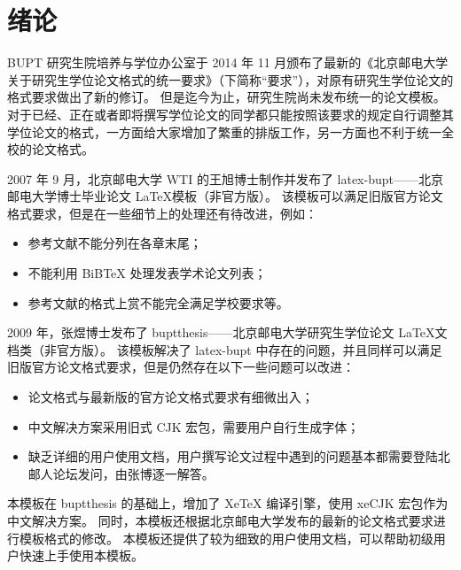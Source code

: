 
\chapter{绪论}

\gls{BUPT} 研究生院培养与学位办公室于 2014 年 11 月颁布了最新的《北京邮电大学关于研究生学位论文格式的统一要求》（下简称“要求”）\cite{BUPT_Thesis_Format_2014}，对原有研究生学位论文的格式要求做出了新的修订。
但是迄今为止，研究生院尚未发布统一的论文模板。
对于已经、正在或者即将撰写学位论文的同学都只能按照该要求的规定自行调整其学位论文的格式，一方面给大家增加了繁重的排版工作，另一方面也不利于统一全校的论文格式。

2007 年 9 月，北京邮电大学 \gls{WTI} 的王旭博士制作并发布了 latex-bupt——北京邮电大学博士毕业论文 \LaTeX 模板（非官方版）\cite{latex-bupt}。
该模板可以满足旧版官方论文格式要求\cite{BUPT_Thesis_Format_2004}，但是在一些细节上的处理还有待改进，例如：
\begin{itemize}
\item 参考文献不能分列在各章末尾；
\item 不能利用 BiBTeX 处理发表学术论文列表；
\item 参考文献的格式上赏不能完全满足学校要求等。
\end{itemize}

2009 年，张煜博士发布了 buptthesis——北京邮电大学研究生学位论文 \LaTeX 文档类（非官方版）\cite{buptthesis}。
该模板解决了 latex-bupt 中存在的问题，并且同样可以满足旧版官方论文格式要求\cite{BUPT_Thesis_Format_2004}，但是仍然存在以下一些问题可以改进：
\begin{itemize}
\item 论文格式与最新版的官方论文格式要求\cite{BUPT_Thesis_Format_2014}有细微出入；
\item 中文解决方案采用旧式 CJK 宏包，需要用户自行生成字体；
\item 缺乏详细的用户使用文档，用户撰写论文过程中遇到的问题基本都需要登陆北邮人论坛发问，由张博逐一解答。
\end{itemize}

本模板在 buptthesis\cite{buptthesis} 的基础上，增加了 XeTeX 编译引擎，使用 xeCJK 宏包作为中文解决方案。
同时，本模板还根据北京邮电大学发布的最新的论文格式要求\parencite{BUPT_Thesis_Format_2014}进行模板格式的修改。
本模板还提供了较为细致的用户使用文档，可以帮助初级用户快速上手使用本模板。

